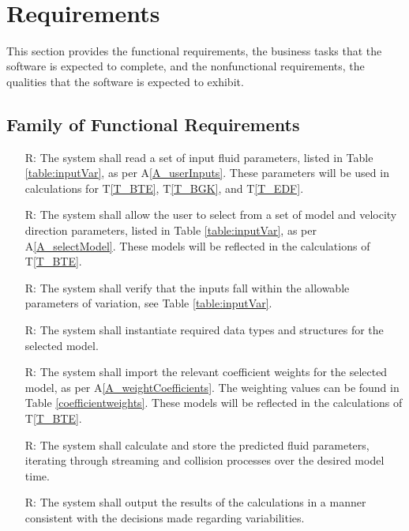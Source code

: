 \documentclass[12pt]{article}
\newcommand{\tref}[1]{T\ref{#1}}
\newcounter{reqnum} %
\begin{document}
~\newpage

\section{Requirements}

This section provides the functional requirements, the business tasks that the
software is expected to complete, and the nonfunctional requirements, the
qualities that the software is expected to exhibit.

\subsection{Family of Functional Requirements}

\noindent \begin{itemize}

\item[R\refstepcounter{reqnum}\thereqnum \label{R_Inputs}:] The system shall read a set of input fluid parameters, listed in Table \ref{table:inputVar}, as per A\ref{A_userInputs}. These parameters will be used in calculations for \tref{T_BTE}, \tref{T_BGK}, and \tref{T_EDF}.

\item[R\refstepcounter{reqnum}\thereqnum \label{R_ModelInputs}:] The system shall allow the user to select from a set of model and velocity direction parameters, listed in Table \ref{table:inputVar}, as per A\ref{A_selectModel}. These models will be reflected in the calculations of \tref{T_BTE}.

\item[R\refstepcounter{reqnum}\thereqnum \label{R_CheckInputs}:] The system shall verify that the inputs fall within the allowable parameters of variation, see Table \ref{table:inputVar}.

\item[R\refstepcounter{reqnum}\thereqnum \label{R_Instantiate}:] The system shall instantiate required data types and structures for the selected model.

\item[R\refstepcounter{reqnum}\thereqnum \label{R_CoefficientWeights}:] The system shall import the relevant coefficient weights for the selected model, as per A\ref{A_weightCoefficients}. The weighting values can be found in Table \ref{coefficientweights}. These models will be reflected in the calculations of \tref{T_BTE}.

\item[R\refstepcounter{reqnum}\thereqnum \label{R_Calculate}:] The system shall calculate and store the predicted fluid parameters, iterating through streaming and collision processes over the desired model time.

\item[R\refstepcounter{reqnum}\thereqnum \label{R_Output}:] The system shall output the results of the calculations in a manner consistent with the decisions made regarding variabilities.

\end{itemize}
\end{document}
